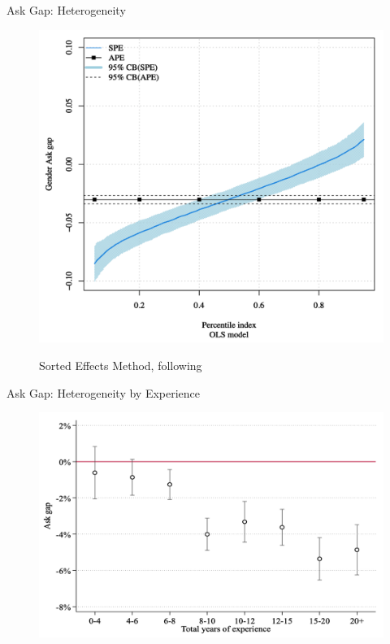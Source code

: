 \begin{frame}{Ask Gap: Heterogeneity}
    \begin{figure}
        \centering
        \includegraphics[height = 0.7 \textheight]{images/askgap_hetero.png}
       
        {\footnotesize Sorted Effects Method, following \citet{chernozhukov2018sorted}}
    \end{figure}
\end{frame}

\begin{frame}{Ask Gap: Heterogeneity by Experience}
    \begin{figure}
        \centering
        \includegraphics[height = 0.7 \textheight]{images/askgap_hetero_exp.png}
    \end{figure}
\end{frame}


